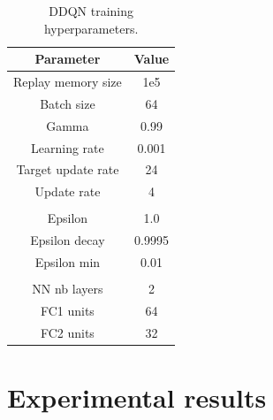 \documentclass[sn-mathphys]{sn-jnl}
\begin{document}
\begin{table}[t]
\begin{center}
    \begin{tabular}{|c c|} 
     \hline
     Parameter & Value \\ 
     \hline
     Replay memory size & 1e5 \\
     Batch size & 64 \\
     Gamma & 0.99 \\
     Learning rate & 0.001 \\
     Target update rate & 24 \\
     Update rate & 4 \\
     & \\
     Epsilon & 1.0 \\
     Epsilon decay & 0.9995 \\
     Epsilon min & 0.01 \\
     & \\
     NN nb layers & 2 \\
     FC1 units & 64 \\
     FC2 units & 32 \\
     \hline
    \end{tabular}
\end{center}
\caption{DDQN training hyperparameters.}
\label{tab:ddqn_hyperparameters}
\end{table}

\section{Experimental results}
\label{sec:results}
\end{document}
